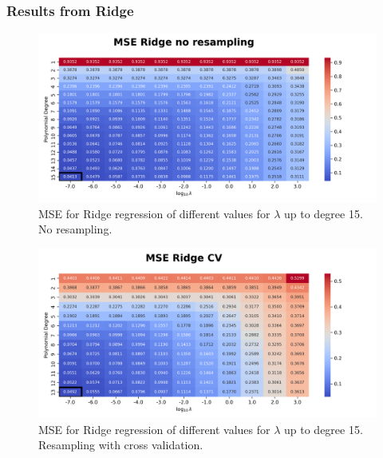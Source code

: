 \documentclass{article}
\begin{document}
\newpage
\subsubsection{Results from Ridge}
\begin{figure}[htbp]
    \centering
    \includegraphics[width=\textwidth]{Project1/figures/Terrain/Heatmap_MSE_Ridge_no_resampling.png}
    \caption{MSE for Ridge regression of different values for $\lambda$ up to degree 15. No resampling.}
    \label{fig:TerrainRidgeNoResamp}
\end{figure}

\begin{figure}[htbp]
    \centering
    \includegraphics[width=\textwidth]{Project1/figures/Terrain/Heatmap_MSE_Ridge_CV.png}
    \caption{MSE for Ridge regression of different values for $\lambda$ up to degree 15. Resampling with cross validation.}
    \label{fig:TerrainRidgeCV}
\end{figure}
\end{document}
